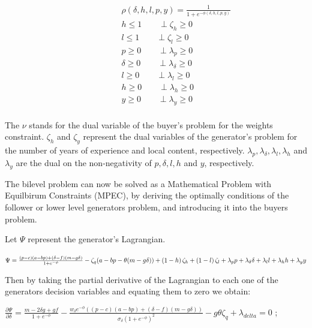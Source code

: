 \documentclass[informs]{informs3}
\begin{document}
\begin{subequations}
\begin{align}
	&\qquad	\qquad \rho(\delta, h, l, p,y)=\frac{1}{1+e^{-\phi(\delta, h, l, p, y)}} \label{eqGeneratorProbability}\\
	&\qquad \qquad  h \leq 1 \label{eqGeneratorFinance}		\qquad \perp \zeta_h \geq 0\\
	&\qquad \qquad  l \leq 1 \label{eqGeneratorLocal}			\qquad \perp \zeta_l \geq 0\\
    &\qquad \qquad  p \geq 0 \label{eqGeneratorPNonN}			\qquad \perp \lambda_p \geq 0\\
    &\qquad \qquad  \delta \geq 0 \label{eqGeneratorDeltaNonN}			\qquad \perp \lambda_{\delta} \geq 0\\
    &\qquad \qquad  l \geq 0 \label{eqGeneratorLocalNonN}			\qquad \perp \lambda_l \geq 0\\
    &\qquad \qquad  h \geq 0 \label{eqGeneratorFinNonN}			\qquad \perp \lambda_h\geq 0\\
    &\qquad \qquad  y\geq 0 \label{eqGeneratorExpNonN}			\qquad \perp \lambda_y \geq 0\\
	\end{align}
\end{subequations}

The $\nu$ stands for the dual variable of the buyer's problem for the weights constraint.  $\zeta_h$ and $\zeta_y$ represent the dual variables of the generator's problem for the number of years of experience and local content, respectively.  $\lambda_p, \lambda_{\delta}, \lambda_l,\lambda_h$ and $\lambda_y$ are the dual on the non-negativity of $p,\delta, l, h$ and $y$, respectively.

The bilevel problem can now be solved as a Mathematical Problem with  Equilbirum Constraints (MPEC), by deriving the optimally conditions of the follower or lower level generators problem, and introducing it into the buyers problem.

Let $\Psi$ represent the generator's Lagrangian.  

$\Psi =\frac{\left(p-c\right)(a - bp )+\left(\delta-f\right)(m -g\delta)}{1+e^{-\phi}} - \zeta_q(a - bp -\theta (m -g\delta))+\left( 1-h\right)\zeta_h+\left( 1-l\right)\zeta_l \\ +\lambda_p p+\lambda_{\delta} \delta+\lambda_l l +\lambda_h h+\lambda_y y  $

Then by taking the partial derivative of the Lagrangian to each one of the generators decision variables and equating them to zero we obtain:

$\frac{\partial \Psi}{\partial \delta} = \frac{m-2\delta g + g f}{1+e^{-\phi}}-\frac{w_{\delta} e^{-\phi} \left(\left(p-c\right)(a - bp )  +\left(\delta-f\right)(m -g\delta)\right)}{\sigma_{\delta}(1+e^{-\phi})^{2}}-g \theta \zeta_q + \lambda_{delta}=0$ ;
\end{document}
